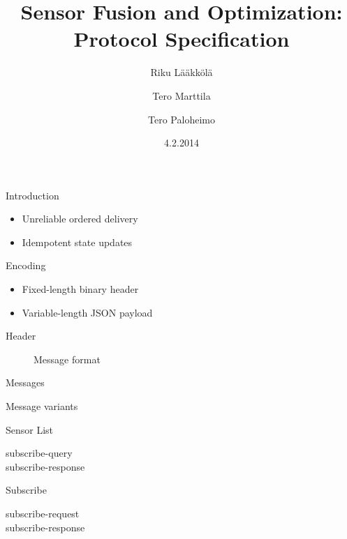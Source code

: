 \documentclass{beamer}
\title[SFO protocol]{Sensor Fusion and Optimization: Protocol Specification}
\author{Riku Lääkkölä \and Tero Marttila \and Tero Paloheimo}
\institute{Aalto ELEC}
\date{4.2.2014}
\begin{document}
\begin{frame}
  \titlepage
\end{frame}

\begin{frame}{Introduction}
\begin{itemize}
	\item Unreliable ordered delivery
    \item Idempotent state updates
\end{itemize}
\end{frame}

\begin{frame}{Encoding}
\begin{itemize}
	\item Fixed-length binary header
    \item Variable-length JSON payload
\end{itemize}
\end{frame}

\begin{frame}{Header}
\begin{figure}
	{\scriptsize}
	\caption{Message format}
	\label{fig:header}
\end{figure}
\end{frame}

\begin{frame}{Messages}
\begin{table}
	\caption{Message variants}
	\label{tbl:messages}
\end{table}
\end{frame}

\begin{frame}{Sensor List}
\begin{description}
	\item[subscribe-query]
    \item[subscribe-response]
\end{description}
\end{frame}

\begin{frame}{Subscribe}
\begin{description}
	\item[subscribe-request]
    \item[subscribe-response]
\end{description}
\end{frame}
\end{document}
